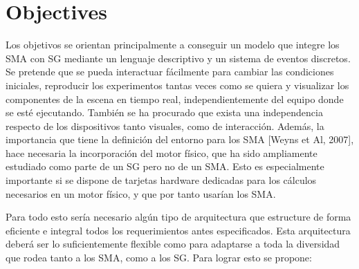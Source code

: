 \documentclass[runningheads]{llncs}
\begin{document}
\section{Objectives
\label{sec:objectives}}

Los objetivos se orientan principalmente a conseguir un modelo que integre los SMA con SG mediante un lenguaje descriptivo y un sistema de eventos discretos. Se pretende que se pueda interactuar fácilmente para cambiar las condiciones iniciales, reproducir los experimentos tantas veces como se quiera y visualizar los componentes de la escena en tiempo real, independientemente del equipo donde se esté ejecutando. También se ha procurado que exista una independencia respecto de los dispositivos tanto visuales, como de interacción. Además, la importancia que tiene la definición del entorno para los SMA [Weyns et Al, 2007], hace necesaria la incorporación del motor físico, que ha sido ampliamente estudiado como parte de un SG pero no de un SMA. Esto es especialmente importante si se dispone de tarjetas hardware dedicadas para los cálculos necesarios en un motor físico, y que por tanto usarían los SMA.

Para todo esto sería necesario algún tipo de arquitectura que estructure de forma eficiente e integral todos los requerimientos antes especificados. Esta arquitectura deberá ser lo suficientemente flexible como para adaptarse a toda la diversidad que rodea tanto a los SMA, como a los SG. Para lograr esto se propone:
\end{document}
